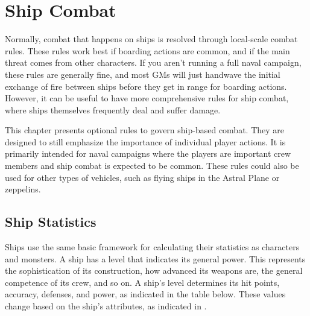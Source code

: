 \chapter{Ship Combat}
Normally, combat that happens on ships is resolved through local-scale combat rules.
These rules work best if boarding actions are common, and if the main threat comes from other characters.
If you aren't running a full naval campaign, these rules are generally fine, and most GMs will just handwave the initial exchange of fire between ships before they get in range for boarding actions.
However, it can be useful to have more comprehensive rules for ship combat, where ships themselves frequently deal and suffer damage.

This chapter presents optional rules to govern ship-based combat.
They are designed to still emphasize the importance of individual player actions.
It is primarily intended for naval campaigns where the players are important crew members and ship combat is expected to be common.
These rules could also be used for other types of vehicles, such as flying ships in the Astral Plane or zeppelins.

\section{Ship Statistics}
  Ships use the same basic framework for calculating their statistics as characters and monsters.
  A ship has a level that indicates its general power.
  This represents the sophistication of its construction, how advanced its weapons are, the general competence of its crew, and so on.
  A ship's level determines its hit points, accuracy, defenses, and power, as indicated in the table below.
  These values change based on the ship's attributes, as indicated in .

